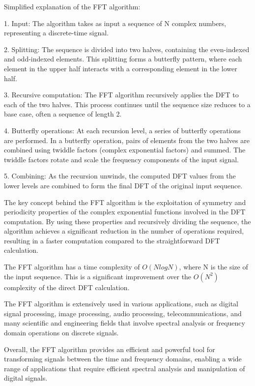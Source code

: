 Simplified explanation of the FFT algorithm:

1. Input: The algorithm takes as input a sequence of N complex numbers, representing a discrete-time signal.

2. Splitting: The sequence is divided into two halves, containing the even-indexed and odd-indexed elements. This splitting forms a butterfly pattern, where each element in the upper half interacts with a corresponding element in the lower half.

3. Recursive computation: The FFT algorithm recursively applies the DFT to each of the two halves. This process continues until the sequence size reduces to a base case, often a sequence of length 2.

4. Butterfly operations: At each recursion level, a series of butterfly operations are performed. In a butterfly operation, pairs of elements from the two halves are combined using twiddle factors (complex exponential factors) and summed. The twiddle factors rotate and scale the frequency components of the input signal.

5. Combining: As the recursion unwinds, the computed DFT values from the lower levels are combined to form the final DFT of the original input sequence.

The key concept behind the FFT algorithm is the exploitation of symmetry and periodicity properties of the complex exponential functions involved in the DFT computation. By using these properties and recursively dividing the sequence, the algorithm achieves a significant reduction in the number of operations required, resulting in a faster computation compared to the straightforward DFT calculation.

The FFT algorithm has a time complexity of $O(N log N)$, where N is the size of the input sequence. This is a significant improvement over the $O(N^2)$ complexity of the direct DFT calculation.

The FFT algorithm is extensively used in various applications, such as digital signal processing, image processing, audio processing, telecommunications, and many scientific and engineering fields that involve spectral analysis or frequency domain operations on discrete signals.

Overall, the FFT algorithm provides an efficient and powerful tool for transforming signals between the time and frequency domains, enabling a wide range of applications that require efficient spectral analysis and manipulation of digital signals.

